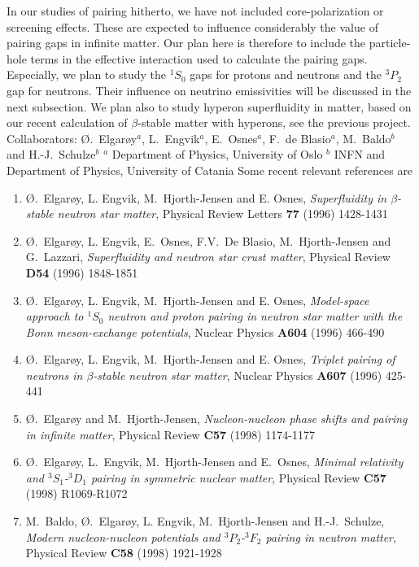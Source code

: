 In our studies of pairing hitherto, we have
not included core-polarization or screening effects. 
These are expected to influence considerably the value of
pairing gaps in infinite matter. 
Our plan here is therefore
to  include the particle-hole terms 
in the effective interaction used to calculate the pairing gaps.
Especially, we plan to study the $^1S_0$ gaps for protons and
neutrons and the $^3P_2$ gap for neutrons.
Their influence on  neutrino emissivities will be discussed
in the next subsection.
We plan also to study hyperon superfluidity in matter, based on our
recent calculation of $\beta$-stable matter with hyperons, see the 
previous project.
\newline
\newline
Collaborators: \O.\ Elgar\o y$^a$,
L.\ Engvik$^a$, E.\ Osnes$^a$, F.\ de Blasio$^a$, M.\ Baldo$^b$
and H.-J.\ Schulze$^b$ \newline
${}^a$ Department of Physics,
University of Oslo\newline
${}^b$ INFN and Department of Physics, University of Catania\newline
\newline\newline
Some recent relevant references are
\begin{enumerate}
\item
    \O.\ Elgar\o y, L. Engvik,
    M.\ Hjorth-Jensen
    and E. Osnes,
    {\em Superfluidity in $\beta$-stable neutron
         star matter},
    Physical Review Letters {\bf 77} (1996) 1428-1431
\item
    \O.\ Elgar\o y, L. Engvik, E.\ Osnes, F.V.\ De Blasio,
    M.\ Hjorth-Jensen and G.\ Lazzari,
    {\em Superfluidity and  neutron star crust matter},
    Physical Review {\bf D54} (1996) 1848-1851
\item
    \O.\ Elgar\o y, L. Engvik,
    M.\ Hjorth-Jensen
    and E. Osnes,
    {\em Model-space approach to $^1S_0$ neutron and proton pairing 
      in neutron star matter with the Bonn meson-exchange potentials},
    Nuclear Physics {\bf A604} (1996) 466-490
\item
    \O.\ Elgar\o y, L. Engvik,
    M.\ Hjorth-Jensen
    and E. Osnes,
    {\em Triplet pairing of neutrons in $\beta$-stable neutron star
         matter},
    Nuclear Physics {\bf A607} (1996) 425-441
\item
    \O.\ Elgar\o y and
    M.\ Hjorth-Jensen,
    {\em Nucleon-nucleon phase shifts and pairing in infinite matter},
    Physical Review {\bf C57 } (1998) 1174-1177
\item
    \O.\ Elgar\o y, L.\ Engvik, 
    M.\ Hjorth-Jensen and E.\ Osnes,
    {\em Minimal relativity and $^3S_1$-$^3D_1$ pairing in symmetric nuclear matter},
    Physical Review {\bf C57} (1998) R1069-R1072 
\item
    M.\ Baldo, \O.\ Elgar\o y, L. Engvik,
    M.\ Hjorth-Jensen and H.-J.\ Schulze,
    {\em Modern nucleon-nucleon potentials and $^3P_2$-$^3F_2$ pairing 
      in neutron matter},
    Physical Review  {\bf C58} (1998)  1921-1928 
\end{enumerate}

